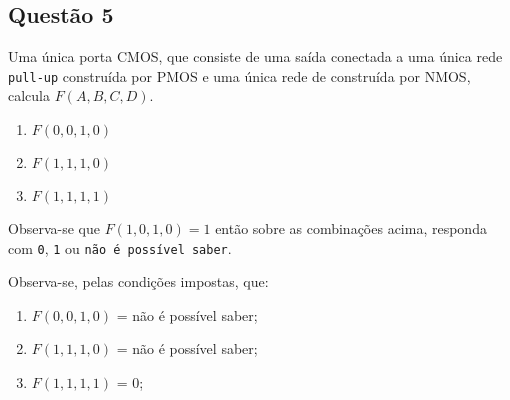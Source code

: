 \documentclass{article}
\begin{document}
\newpage
        \subsection{Questão 5}
            \begin{exercise}
                Uma única porta CMOS, que consiste de uma saída conectada a uma única rede \texttt{pull-up} construída por PMOS e uma única rede de  construída por NMOS, calcula $F(A,B,C,D)$.
                    \begin{enumerate}[noitemsep]
                        \item $F(0,0,1,0)$
                        \item $F(1,1,1,0)$
                        \item $F(1,1,1,1)$
                    \end{enumerate}
                Observa-se que $F(1,0,1,0)=1$ então sobre as combinações acima, responda com \texttt{0}, \texttt{1} ou \texttt{não é possível saber}.
            \end{exercise}
            \begin{resolution}
                Observa-se, pelas condições impostas, que:
                    \begin{enumerate}[noitemsep]
                        \item $F(0,0,1,0)$ = não é possível saber;
                        \item $F(1,1,1,0)$ = não é possível saber;
                        \item $F(1,1,1,1)$ = 0;
                    \end{enumerate}
            \end{resolution}

\newpage
\end{document}
